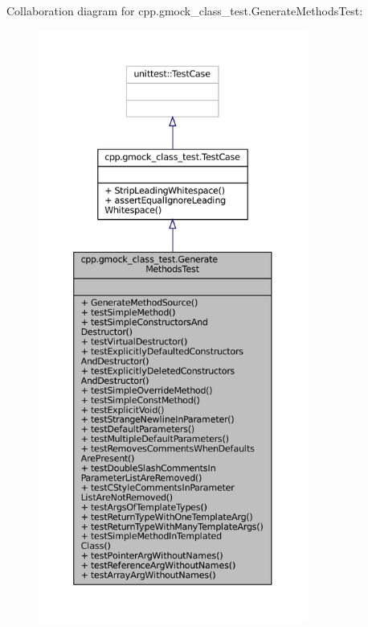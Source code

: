 Collaboration diagram for cpp.\+gmock\+\_\+class\+\_\+test.\+Generate\+Methods\+Test\+:
\nopagebreak
\begin{figure}[H]
\begin{center}
\leavevmode
\includegraphics[height=550pt]{classcpp_1_1gmock__class__test_1_1GenerateMethodsTest__coll__graph}
\end{center}
\end{figure}
